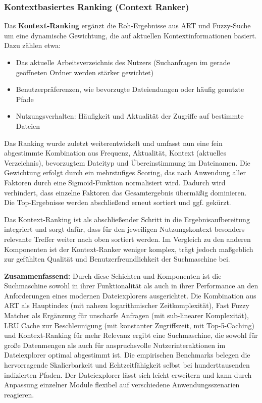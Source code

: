 \subsubsection{Kontextbasiertes Ranking (Context Ranker)}
Das \textbf{Kontext-Ranking} ergänzt die Roh-Ergebnisse aus ART und Fuzzy-Suche um eine dynamische Gewichtung, die auf aktuellen Kontextinformationen basiert. Dazu zählen etwa:
\begin{itemize}
	\item Das aktuelle Arbeitsverzeichnis des Nutzers (Suchanfragen im gerade geöffneten Ordner werden stärker gewichtet)
	\item Benutzerpräferenzen, wie bevorzugte Dateiendungen oder häufig genutzte Pfade
	\item Nutzungsverhalten: Häufigkeit und Aktualität der Zugriffe auf bestimmte Dateien
\end{itemize}

Das Ranking wurde zuletzt weiterentwickelt und umfasst nun eine fein abgestimmte Kombination aus Frequenz, Aktualität, Kontext (aktuelles Verzeichnis), bevorzugtem Dateityp und Übereinstimmung im Dateinamen. Die Gewichtung erfolgt durch ein mehrstufiges Scoring, das nach Anwendung aller Faktoren durch eine Sigmoid-Funktion normalisiert wird. Dadurch wird verhindert, dass einzelne Faktoren das Gesamtergebnis übermäßig dominieren. Die Top-Ergebnisse werden abschließend erneut sortiert und ggf. gekürzt.

Das Kontext-Ranking ist als abschließender Schritt in die Ergebnisaufbereitung integriert und sorgt dafür, dass für den jeweiligen Nutzungskontext besonders relevante Treffer weiter nach oben sortiert werden. Im Vergleich zu den anderen Komponenten ist der Kontext-Ranker weniger komplex, trägt jedoch maßgeblich zur gefühlten Qualität und Benutzerfreundlichkeit der Suchmaschine bei.

\vspace{0.5em}
\noindent
\textbf{Zusammenfassend:} Durch diese Schichten und Komponenten ist die Suchmaschine sowohl in ihrer Funktionalität als auch in ihrer Performance an den Anforderungen eines modernen Dateiexplorers ausgerichtet. Die Kombination aus ART als Hauptindex (mit nahezu logarithmischer Zeitkomplexität), Fast Fuzzy Matcher als Ergänzung für unscharfe Anfragen (mit sub-linearer Komplexität), LRU Cache zur Beschleunigung (mit konstanter Zugriffszeit, mit Top-5-Caching) und Kontext-Ranking für mehr Relevanz ergibt eine Suchmaschine, die sowohl für große Datenmengen als auch für anspruchsvolle Nutzerinteraktionen im Dateiexplorer optimal abgestimmt ist. Die empirischen Benchmarks belegen die hervorragende Skalierbarkeit und Echtzeitfähigkeit selbst bei hunderttausenden indizierten Pfaden. Der Dateiexplorer lässt sich leicht erweitern und kann durch Anpassung einzelner Module flexibel auf verschiedene Anwendungsszenarien reagieren.
